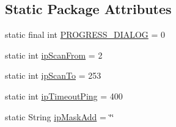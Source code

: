 \subsection*{\-Static \-Package \-Attributes}
\begin{DoxyCompactItemize}
\item 
static final int \hyperlink{classcom_1_1axcoto_1_1shinjuku_1_1sushi_1_1_device_activity_a677c859dfacb01cdb0b5c4866505729a}{\-P\-R\-O\-G\-R\-E\-S\-S\-\_\-\-D\-I\-A\-L\-O\-G} = 0
\item 
static int \hyperlink{classcom_1_1axcoto_1_1shinjuku_1_1sushi_1_1_device_activity_a61f5f7bc06ebd608448533adcc79459b}{ip\-Scan\-From} = 2
\item 
static int \hyperlink{classcom_1_1axcoto_1_1shinjuku_1_1sushi_1_1_device_activity_a2130e0832d315259bf3e07d7e4e3af5c}{ip\-Scan\-To} = 253
\item 
static int \hyperlink{classcom_1_1axcoto_1_1shinjuku_1_1sushi_1_1_device_activity_a719a84da11fb1de67b04772b06684513}{ip\-Timeout\-Ping} = 400
\item 
static \-String \hyperlink{classcom_1_1axcoto_1_1shinjuku_1_1sushi_1_1_device_activity_a59a64a7255aa5deb40208cc228772dc6}{ip\-Mask\-Add} = \char`\"{}\char`\"{}
\end{DoxyCompactItemize}


